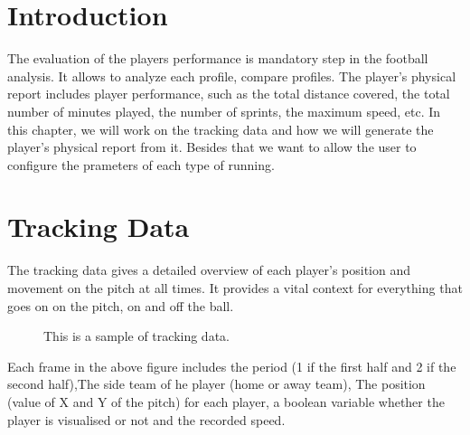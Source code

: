 \documentclass[letterpaper,10pt,english]{jupyterBook}
\begin{document}
\section{Introduction}
\label{\detokenize{Chap2/chap2:introduction}}
\sphinxAtStartPar
The evaluation of the players performance is mandatory step in the football analysis. It allows to analyze each profile, compare profiles.
The player’s physical report includes player performance, such as the total distance covered, the total number of minutes played, the number of sprints, the maximum speed, etc.
In this chapter, we will work on the tracking data and how we will generate the player’s physical report from it.
Besides that we want to allow the user to configure the prameters of each type of running.


\section{Tracking Data}
\label{\detokenize{Chap2/chap2:tracking-data}}
\sphinxAtStartPar
The tracking data gives a detailed overview of each player’s position and movement on the pitch at all times. It provides a vital context for everything that goes on on the pitch, on and off the ball.

\begin{figure}[htbp]
\centering
\capstart

\noindent{}
\caption{This is a sample of tracking data.}\label{\detokenize{Chap2/chap2:tracking-fig}}\end{figure}

\sphinxAtStartPar
Each frame in the above figure includes the period (1 if the first half and 2 if the second half),The side team of he player (home or away team), The position (value of X and Y of the pitch) for each player, a boolean variable whether the player is visualised or not and the recorded speed.
\end{document}
